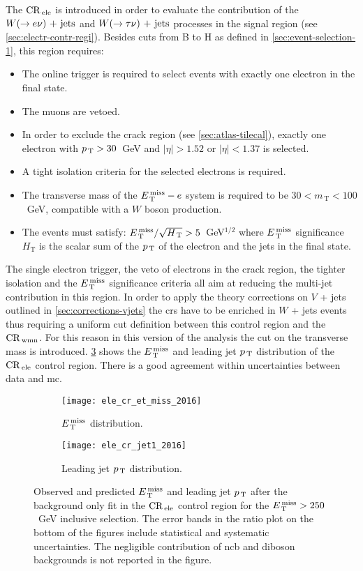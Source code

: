 The $\mathrm{CR}_\mathrm{\, ele}$ is introduced in order to evaluate the contribution of the
$W (\rightarrow e \nu)\mathrm{~+~jets}$ and $W (\rightarrow \tau \nu)\mathrm{~+~jets}$ processes in the signal region (see
\cref{sec:electr-contr-regi}). Besides cuts from B to H as defined in
\cref{sec:event-selection-1}, this region requires:
\begin{itemize}
\item The online trigger is required to select events with exactly one electron
  in the final state.
\item The muons are vetoed.
\item In order to exclude the crack region (see \cref{sec:atlas-tilecal}),
  exactly one electron with $p_\mathrm{\, T} > 30$~GeV and $|\eta| > 1.52$ or $|\eta| <
  1.37$ is selected.
\item A tight isolation criteria for the selected electrons is required.
\item The transverse mass of the $E_\mathrm{\, T}^\mathrm{\, miss} - e$ system is required to be $30 <
  m_\mathrm{\, T} < 100$~GeV, compatible with a $W$ boson production.
\item The events must satisfy:
  $E_\mathrm{\, T}^\mathrm{\, miss}/\sqrt{H_\mathrm{\, T}} > 5$~GeV$^{1/2}$ where $E_\mathrm{\, T}^\mathrm{\, miss}$
  significance $H_\mathrm{T}$ is the scalar sum of the $p_\mathrm{\, T}$ of the electron and
  the jets in the final state.
\end{itemize}
The single electron trigger, the veto of electrons in the crack region, the
tighter isolation and the $E_\mathrm{\, T}^\mathrm{\, miss}$ significance criteria all aim at reducing the
multi-jet contribution in this region. In order to apply the theory corrections
on $V$ + jets outlined in \cref{sec:corrections-vjets} the \glspl{cr} have to be
enriched in $W$ + jets events thus requiring a uniform cut definition between
this control region and the $\mathrm{CR}_\mathrm{\, wmn}$. For this reason in this version of the
analysis the cut on the transverse mass is
introduced. \cref{fig:ele_cr_plots_2016} shows the $E_\mathrm{\, T}^\mathrm{\, miss}$ and leading jet $p_\mathrm{\, T}$
distribution of the $\mathrm{CR}_\mathrm{\, ele}$ control region. There is a good agreement within
uncertainties between data and \gls{mc}.
\begin{figure}[!th]
  \centering
  \begin{subfigure}[t]{.48\linewidth}
    \texttt{[image: ele\_cr\_et\_miss\_2016]}
    \caption{$E_\mathrm{\, T}^\mathrm{\, miss}$ distribution.}
    \label{fig:ele_cr_met}
  \end{subfigure}
  \begin{subfigure}[t]{.48\linewidth}
    \texttt{[image: ele\_cr\_jet1\_2016]}
    \caption{Leading jet $p_\mathrm{\, T}$ distribution.}
    \label{fig:ele_cr_jet1}
  \end{subfigure}
  \caption{Observed and predicted $E_\mathrm{\, T}^\mathrm{\, miss}$ and leading jet $p_\mathrm{\, T}$ after the
    background only fit in the $\mathrm{CR}_\mathrm{\, ele}$ control region for the $E_\mathrm{\, T}^\mathrm{\, miss} > 250$~GeV
    inclusive selection. The error bands in the ratio plot on the bottom of the
    figures include statistical and systematic uncertainties. The negligible
    contribution of \gls{ncb} and diboson backgrounds is not reported in the
    figure.}
  \label{fig:ele_cr_plots_2016}
\end{figure}
